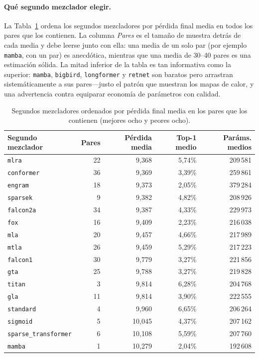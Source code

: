 \paragraph{Qué segundo mezclador elegir.}
La Tabla~\ref{tab:r2-best-b} ordena los segundos mezcladores por pérdida final media en todos los pares que los contienen. La columna \emph{Pares} es el tamaño de muestra detrás de cada media y debe leerse junto con ella: una media de un solo par (por ejemplo \texttt{mamba}, con un par) es anecdótica, mientras que una media de 30--40 pares es una estimación sólida. La mitad inferior de la tabla es tan informativa como la superior: \texttt{mamba}, \texttt{bigbird}, \texttt{longformer} y \texttt{retnet} son baratos pero arrastran sistemáticamente a sus pares---justo el patrón que muestran los mapas de calor, y una advertencia contra equiparar economía de parámetros con calidad.

\begin{table}[H]
\centering
\small
\caption{Segundos mezcladores ordenados por pérdida final media en los pares que los contienen (mejores ocho y peores ocho).}
\label{tab:r2-best-b}
\begin{tabular}{lrrrr}
\toprule
Segundo mezclador & Pares & Pérdida media & Top-1 medio & Paráms. medios \\
\midrule
\texttt{mlra}        & 22 & 9,368 & 5,74\% & 209\,581 \\
\texttt{conformer}   & 36 & 9,369 & 3,39\% & 259\,861 \\
\texttt{engram}      & 18 & 9,373 & 2,05\% & 379\,284 \\
\texttt{sparsek}     & 9  & 9,382 & 4,82\% & 208\,926 \\
\texttt{falcon2a}    & 34 & 9,387 & 4,33\% & 229\,973 \\
\texttt{fox}         & 16 & 9,409 & 2,23\% & 216\,038 \\
\texttt{mla}         & 20 & 9,457 & 4,66\% & 217\,989 \\
\texttt{mtla}        & 26 & 9,459 & 5,29\% & 217\,223 \\
\midrule
\texttt{falcon1}     & 30 & 9,779 & 3,27\% & 221\,856 \\
\texttt{gta}         & 25 & 9,788 & 3,27\% & 219\,828 \\
\texttt{titan}       & 3  & 9,814 & 6,28\% & 204\,768 \\
\texttt{gla}         & 11 & 9,814 & 3,90\% & 222\,555 \\
\texttt{standard}    & 4  & 9,960 & 6,65\% & 206\,264 \\
\texttt{sigmoid}     & 5  & 10,045 & 4,37\% & 207\,162 \\
\texttt{sparse\_transformer} & 6 & 10,108 & 5,59\% & 207\,760 \\
\texttt{mamba}       & 1  & 10,279 & 2,04\% & 192\,608 \\
\bottomrule
\end{tabular}
\end{table}

